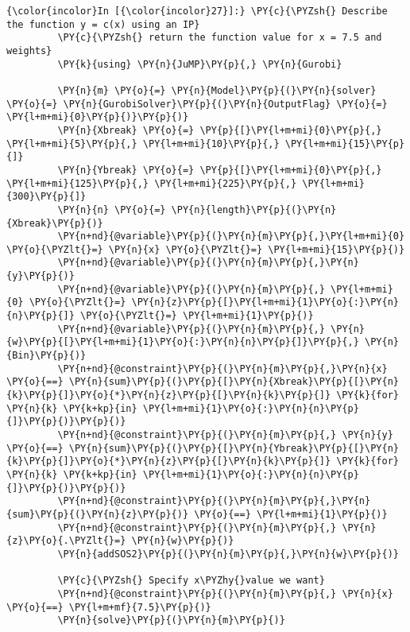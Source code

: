 \begin{codeCell}
    \begin{Verbatim}[commandchars=\\\{\}]
{\color{incolor}In [{\color{incolor}27}]:} \PY{c}{\PYZsh{} Describe the function y = c(x) using an IP}
         \PY{c}{\PYZsh{} return the function value for x = 7.5 and weights}
         \PY{k}{using} \PY{n}{JuMP}\PY{p}{,} \PY{n}{Gurobi}
         
         \PY{n}{m} \PY{o}{=} \PY{n}{Model}\PY{p}{(}\PY{n}{solver} \PY{o}{=} \PY{n}{GurobiSolver}\PY{p}{(}\PY{n}{OutputFlag} \PY{o}{=} \PY{l+m+mi}{0}\PY{p}{)}\PY{p}{)}
         \PY{n}{Xbreak} \PY{o}{=} \PY{p}{[}\PY{l+m+mi}{0}\PY{p}{,} \PY{l+m+mi}{5}\PY{p}{,} \PY{l+m+mi}{10}\PY{p}{,} \PY{l+m+mi}{15}\PY{p}{]}
         \PY{n}{Ybreak} \PY{o}{=} \PY{p}{[}\PY{l+m+mi}{0}\PY{p}{,} \PY{l+m+mi}{125}\PY{p}{,} \PY{l+m+mi}{225}\PY{p}{,} \PY{l+m+mi}{300}\PY{p}{]}
         \PY{n}{n} \PY{o}{=} \PY{n}{length}\PY{p}{(}\PY{n}{Xbreak}\PY{p}{)}
         \PY{n+nd}{@variable}\PY{p}{(}\PY{n}{m}\PY{p}{,}\PY{l+m+mi}{0} \PY{o}{\PYZlt{}=} \PY{n}{x} \PY{o}{\PYZlt{}=} \PY{l+m+mi}{15}\PY{p}{)}
         \PY{n+nd}{@variable}\PY{p}{(}\PY{n}{m}\PY{p}{,}\PY{n}{y}\PY{p}{)}
         \PY{n+nd}{@variable}\PY{p}{(}\PY{n}{m}\PY{p}{,} \PY{l+m+mi}{0} \PY{o}{\PYZlt{}=} \PY{n}{z}\PY{p}{[}\PY{l+m+mi}{1}\PY{o}{:}\PY{n}{n}\PY{p}{]} \PY{o}{\PYZlt{}=} \PY{l+m+mi}{1}\PY{p}{)}
         \PY{n+nd}{@variable}\PY{p}{(}\PY{n}{m}\PY{p}{,} \PY{n}{w}\PY{p}{[}\PY{l+m+mi}{1}\PY{o}{:}\PY{n}{n}\PY{p}{]}\PY{p}{,} \PY{n}{Bin}\PY{p}{)}
         \PY{n+nd}{@constraint}\PY{p}{(}\PY{n}{m}\PY{p}{,}\PY{n}{x} \PY{o}{==} \PY{n}{sum}\PY{p}{(}\PY{p}{[}\PY{n}{Xbreak}\PY{p}{[}\PY{n}{k}\PY{p}{]}\PY{o}{*}\PY{n}{z}\PY{p}{[}\PY{n}{k}\PY{p}{]} \PY{k}{for} \PY{n}{k} \PY{k+kp}{in} \PY{l+m+mi}{1}\PY{o}{:}\PY{n}{n}\PY{p}{]}\PY{p}{)}\PY{p}{)}
         \PY{n+nd}{@constraint}\PY{p}{(}\PY{n}{m}\PY{p}{,} \PY{n}{y} \PY{o}{==} \PY{n}{sum}\PY{p}{(}\PY{p}{[}\PY{n}{Ybreak}\PY{p}{[}\PY{n}{k}\PY{p}{]}\PY{o}{*}\PY{n}{z}\PY{p}{[}\PY{n}{k}\PY{p}{]} \PY{k}{for} \PY{n}{k} \PY{k+kp}{in} \PY{l+m+mi}{1}\PY{o}{:}\PY{n}{n}\PY{p}{]}\PY{p}{)}\PY{p}{)}
         \PY{n+nd}{@constraint}\PY{p}{(}\PY{n}{m}\PY{p}{,}\PY{n}{sum}\PY{p}{(}\PY{n}{z}\PY{p}{)} \PY{o}{==} \PY{l+m+mi}{1}\PY{p}{)}
         \PY{n+nd}{@constraint}\PY{p}{(}\PY{n}{m}\PY{p}{,} \PY{n}{z}\PY{o}{.\PYZlt{}=} \PY{n}{w}\PY{p}{)}
         \PY{n}{addSOS2}\PY{p}{(}\PY{n}{m}\PY{p}{,}\PY{n}{w}\PY{p}{)}
         
         \PY{c}{\PYZsh{} Specify x\PYZhy{}value we want}
         \PY{n+nd}{@constraint}\PY{p}{(}\PY{n}{m}\PY{p}{,} \PY{n}{x} \PY{o}{==} \PY{l+m+mf}{7.5}\PY{p}{)}
         \PY{n}{solve}\PY{p}{(}\PY{n}{m}\PY{p}{)}
         

\end{Verbatim}
\end{codeCell}
